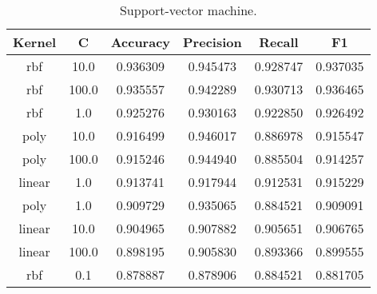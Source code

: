 \begin{appendices}
\begin{table}
\begin{tabular*}{\textwidth}{c @{\extracolsep{\fill}} ccccc}

\toprule
 Kernel &      C &  Accuracy &  Precision &    Recall &        F1 \\
\midrule
    rbf &   10.0 &  0.936309 &   0.945473 &  0.928747 &  0.937035 \\
    rbf &  100.0 &  0.935557 &   0.942289 &  0.930713 &  0.936465 \\
    rbf &    1.0 &  0.925276 &   0.930163 &  0.922850 &  0.926492 \\
   poly &   10.0 &  0.916499 &   0.946017 &  0.886978 &  0.915547 \\
   poly &  100.0 &  0.915246 &   0.944940 &  0.885504 &  0.914257 \\
 linear &    1.0 &  0.913741 &   0.917944 &  0.912531 &  0.915229 \\
   poly &    1.0 &  0.909729 &   0.935065 &  0.884521 &  0.909091 \\
 linear &   10.0 &  0.904965 &   0.907882 &  0.905651 &  0.906765 \\
 linear &  100.0 &  0.898195 &   0.905830 &  0.893366 &  0.899555 \\
    rbf &    0.1 &  0.878887 &   0.878906 &  0.884521 &  0.881705 \\
\bottomrule

\end{tabular*}
\caption{\label{tab:Support-vector machine}Support-vector machine.}
\end{table}

\begin{table}
\hskip-1.2cm\begin{tabular*}{1.2\textwidth }{c @{\extracolsep{\fill}} cccccc}


\end{tabular*}
\end{table}
\end{appendices}
